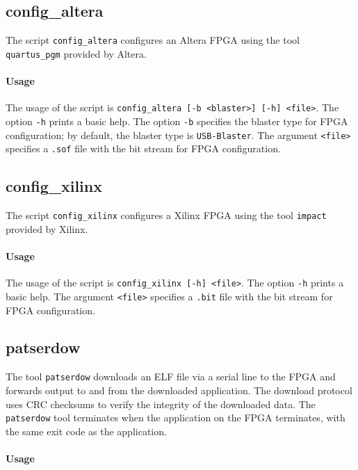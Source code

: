 \documentclass[a4paper,fontsize=10pt,twoside,DIV15,BCOR12mm,headinclude=true,footinclude=false,pagesize,bibtotoc]{scrbook}
\begin{document}
\subsection{config\_altera}

The script \texttt{config\_altera} configures an Altera FPGA using the
tool \texttt{quartus\_pgm} provided by Altera.

\paragraph{Usage}

The usage of the script is \texttt{config\_altera [-b <blaster>] [-h]
  <file>}. The option \texttt{-h} prints a basic help. The option
\texttt{-b} specifies the blaster type for FPGA configuration; by
default, the blaster type is \texttt{USB-Blaster}. The argument
\texttt{<file>} specifies a \texttt{.sof} file with the bit stream for
FPGA configuration.

\subsection{config\_xilinx}

The script \texttt{config\_xilinx} configures a Xilinx FPGA using the
tool \texttt{impact} provided by Xilinx.

\paragraph{Usage}

The usage of the script is \texttt{config\_xilinx [-h] <file>}. The
option \texttt{-h} prints a basic help. The argument \texttt{<file>}
specifies a \texttt{.bit} file with the bit stream for FPGA
configuration.

\subsection{patserdow}

The tool \texttt{patserdow} downloads an ELF file via a serial line to
the FPGA and forwards output to and from the downloaded
application. The download protocol uses CRC checksums to verify the
integrity of the downloaded data. The \texttt{patserdow} tool
terminates when the application on the FPGA terminates, with the same
exit code as the application.

\paragraph{Usage}
\end{document}
